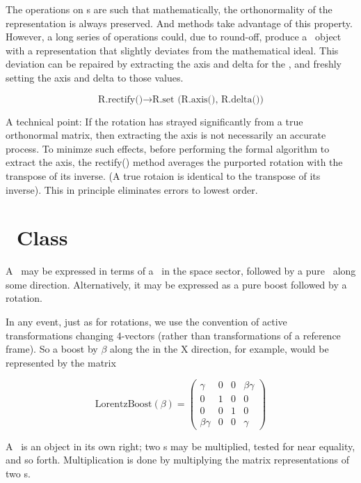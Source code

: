 The operations on \Ro s are such that mathematically, the orthonormality of 
the representation is always preserved.  And methods take advantage of this 
property. 
However, a long series of operations could, due to round-off, produce a 
\Ro\ object with a representation that slightly deviates from the  
mathematical
ideal.  This deviation can be repaired by extracting the axis and delta
for the \Ro, and freshly setting the axis and delta to those values.

\begin{equation}
\label{eq:rectRot}
\mbox{R.rectify()} \rightarrow \mbox{R.set (R.axis(), R.delta())}
\end{equation}

A technical point:  If the rotation has strayed significantly from a true
orthonormal matrix, then extracting the axis is not necessarily an accurate
process.  To minimze such effects, before performing the formal algorithm
to extract the axis, the rectify() method averages the purported rotation 
with the transpose of its inverse.  (A true rotaion is identical to the 
transpose of its inverse).  This in principle eliminates errors to lowest 
order.


\section{\protect\LT\ Class}

A \LT\ may be
expressed in terms of a \Rotation\ in the space sector, followed by
a pure \LB\ along some direction.
Alternatively, it may be expressed as a pure boost followed by a rotation.

In any event, just as for rotations,
we use the convention of active transformations changing 4-vectors
(rather than transformations of a reference frame).  So a boost by
$\beta$ along the in the X direction, for example, would be represented by
the matrix

\begin{equation}
\label{eq:boostx}
  \mbox{LorentzBoost}(\beta) =
\left(
\begin{array}{cccc}
 \gamma & 0 & 0 & \beta \gamma \\
 0 & 1 & 0 & 0 \\
 0 & 0 & 1 & 0 \\
 \beta \gamma & 0 & 0 & \gamma
\end{array}
\right)
\end{equation}

A \LT\ is an object in its own right; two \LT s may be multiplied,
tested for near equality, and so forth.
Multiplication is done by multiplying the matrix representations of two
\LT s.

